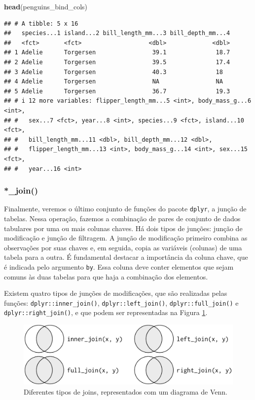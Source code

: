 \documentclass[
]{article}
\newenvironment{Shaded}{\begin{snugshade}}{\end{snugshade}}
\newcommand{\FunctionTok}[1]{\textcolor[rgb]{0.13,0.29,0.53}{\textbf{#1}}}
\newcommand{\NormalTok}[1]{#1}
\begin{document}
\begin{Shaded}
\begin{Highlighting}[]
\FunctionTok{head}\NormalTok{(penguins\_bind\_cols)}
\end{Highlighting}
\end{Shaded}

\begin{verbatim}
## # A tibble: 5 x 16
##   species...1 island...2 bill_length_mm...3 bill_depth_mm...4
##   <fct>       <fct>                   <dbl>             <dbl>
## 1 Adelie      Torgersen                39.1              18.7
## 2 Adelie      Torgersen                39.5              17.4
## 3 Adelie      Torgersen                40.3              18  
## 4 Adelie      Torgersen                NA                NA  
## 5 Adelie      Torgersen                36.7              19.3
## # i 12 more variables: flipper_length_mm...5 <int>, body_mass_g...6 <int>,
## #   sex...7 <fct>, year...8 <int>, species...9 <fct>, island...10 <fct>,
## #   bill_length_mm...11 <dbl>, bill_depth_mm...12 <dbl>,
## #   flipper_length_mm...13 <int>, body_mass_g...14 <int>, sex...15 <fct>,
## #   year...16 <int>
\end{verbatim}

\hypertarget{join}{%
\subsubsection{*\_join()}\label{join}}

Finalmente, veremos o último conjunto de funções do pacote \texttt{dplyr}, a junção de tabelas. Nessa operação, fazemos a combinação de pares de conjunto de dados tabulares por uma ou mais colunas chaves. Há dois tipos de junções: junção de modificação e junção de filtragem. A junção de modificação primeiro combina as observações por suas chaves e, em seguida, copia as variáveis (colunas) de uma tabela para a outra. É fundamental destacar a importância da coluna chave, que é indicada pelo argumento \texttt{by}. Essa coluna deve conter elementos que sejam comuns às duas tabelas para que haja a combinação dos elementos.

Existem quatro tipos de junções de modificações, que são realizadas pelas funções: \texttt{dplyr::inner\_join()}, \texttt{dplyr::left\_join()}, \texttt{dplyr::full\_join()} e \texttt{dplyr::right\_join()}, e que podem ser representadas na Figura \ref{fig:fig-r-join}.

\begin{figure}
\includegraphics[width=15.31in]{figures/cap05_fig03} \caption{Diferentes tipos de joins, representados com um diagrama de Venn.}\label{fig:fig-r-join}
\end{figure}
\end{document}
